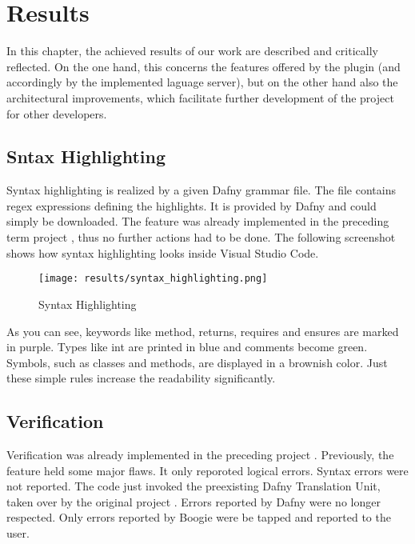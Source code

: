 \section{Results}
\label{section:results}
In this chapter, the achieved results of our work are described and critically reflected.
On the one hand, this concerns the features offered by the plugin
(and accordingly by the implemented laguage server),
but on the other hand also the architectural improvements,
which facilitate further development of the project for other developers.


\subsection{Sntax Highlighting}
\label{section:result_syntaxhighgliht}
Syntax highlighting is realized by a given Dafny grammar file.
The file contains regex expressions defining the highlights.
It is provided by Dafny  and could simply be downloaded.
The feature was already implemented in the preceding term project \cite{sa}, thus no further actions had to be done.
The following screenshot shows how syntax highlighting looks inside Visual Studio Code.

\begin{figure}[H]
    \centering
    \texttt{[image: results/syntax\_highlighting.png]}
    \caption{Syntax Highlighting}
    \label{fig:result_syntax_highlight}
\end{figure}

As you can see, keywords like method, returns, requires and ensures are marked in purple.
Types like int are printed in blue and comments become green. Symbols, such as classes and
methods, are displayed in a brownish color. Just these simple rules increase the readability
significantly.


\subsection{Verification}
Verification was already implemented in the preceding project \cite{sa}.
Previously, the feature held some major flaws.
It only reporoted logical errors.
Syntax errors were not reported.
The code just invoked the preexisting Dafny Translation Unit, taken over by the original project \cite{ba}.
Errors reported by Dafny were no longer respected.
Only errors reported by Boogie were be tapped and reported to the user.

